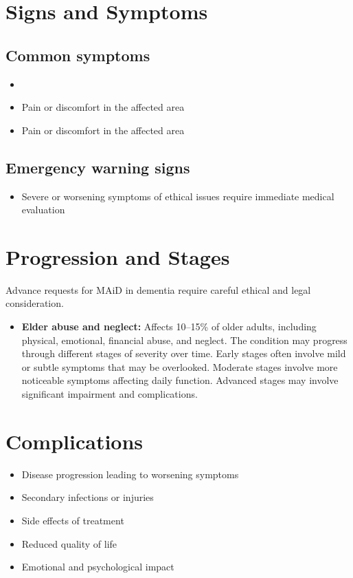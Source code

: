 \section{Signs and Symptoms}

\subsection{Common symptoms}
\begin{itemize}[noitemsep]
  \item \item Pain or discomfort in the affected area    \item Pain or discomfort in the affected area
  \end{itemize}

\subsection{Emergency warning signs}
\begin{itemize}[noitemsep]
  \item Severe or worsening symptoms of ethical issues require immediate medical evaluation
\end{itemize}

\section{Progression and Stages}
Advance requests for MAiD in dementia require careful ethical and legal consideration.
\begin{itemize}[noitemsep]
  \item \textbf{Elder abuse and neglect:} Affects 10--15\% of older adults, including physical, emotional, financial abuse, and neglect. The condition may progress through different stages of severity over time. Early stages often involve mild or subtle symptoms that may be overlooked. Moderate stages involve more noticeable symptoms affecting daily function. Advanced stages may involve significant impairment and complications.
\end{itemize}

\section{Complications}
\begin{itemize}[noitemsep]
  \item Disease progression leading to worsening symptoms
  \item Secondary infections or injuries
  \item Side effects of treatment
  \item Reduced quality of life
  \item Emotional and psychological impact
\end{itemize}
